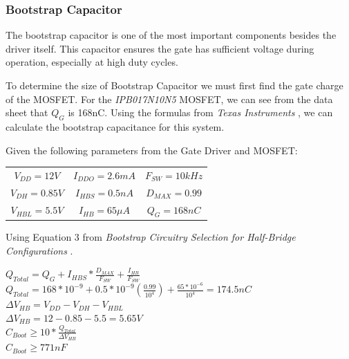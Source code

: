 \documentclass{article}
\begin{document}
		\subsubsection{Bootstrap Capacitor}
		The bootstrap capacitor is one of the most important components besides the driver itself.  This capacitor ensures the gate has sufficient voltage during operation, especially at high duty cycles. 
		
		\noindent To determine the size of Bootstrap Capacitor we must first find the gate charge of the MOSFET.  For the \textit{IPB017N10N5} MOSFET, we can see from the data sheet that $Q_G$ is 168nC.  Using the formulas from \textit{Texas Instruments} \cite{Bootstrap Equations}, we can calculate the bootstrap capacitance for this system.
		
		\vspace{3mm}
		\noindent Given the following parameters from the Gate Driver and MOSFET:
		
		\begin{center}
			\begin{tabular}{ c c c }
			$V_{DD} = 12V$ & $I_{DDO} = 2.6mA$ & $F_{SW} = 10kHz$ \\
			$V_{DH} = 0.85V$ & $I_{HBS} = 0.5nA$ & $D_{MAX} = 0.99$ \\
			$V_{HBL} = 5.5V$& $I_{HB} = 65\mu A$ & $Q_G = 168nC$ \\
			\end{tabular}
		\end{center}

		Using Equation 3 from \textit{Bootstrap Circuitry Selection for Half-Bridge Configurations} \cite{Bootstrap Equations}.
			
		\begin{center}
			$Q_{Total} = Q_G + I_{HBS}*\frac{D_{MAX}}{F_{SW}} + \frac{I_{HB}}{F_{SW}}$ \\
			\vspace{3mm}  
			$Q_{Total} = 168*10^{-9} + 0.5*10^{-9}(\frac{0.99}{10^4}) + \frac{65*10^{-6}}{10^4} = 174.5nC$ \\
			\vspace{3mm}
			$\Delta V_{HB} = V_{DD} - V_{DH} - V_{HBL}$ \\
			\vspace{3mm}
			$\Delta V_{HB} = 12 - 0.85 - 5.5 = 5.65V$ \\
			\vspace{3mm}
			$C_{Boot} \ge 10*\frac{Q_{Total}}{\Delta V_{HB}}$ \\
			\vspace{3mm}
			$C_{Boot} \ge 771nF$ \\
		\end{center}
		
\end{document}
